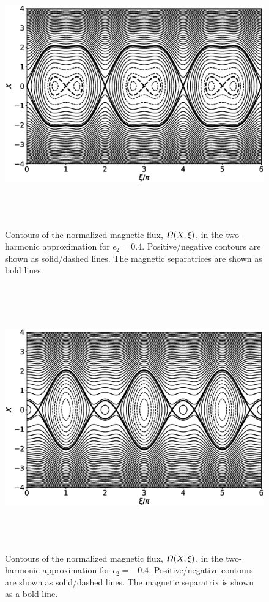 \documentclass[12pt,prb,aps]{revtex4-1}
\begin{document}
\begin{figure}
\centerline{\includegraphics[height=4.5in]{Figure3.eps}}
\caption{ Contours of the normalized magnetic flux, ${\mit\Omega}(X,\xi)$, in the two-harmonic approximation for 
$\epsilon_2=0.4$. Positive/negative contours are shown as solid/dashed lines. The magnetic separatrices are shown
as  bold lines.}\label{fig3}
\end{figure}

\begin{figure}
\centerline{\includegraphics[height=4.5in]{Figure4.eps}}
\caption{ Contours of the normalized magnetic flux, ${\mit\Omega}(X,\xi)$, in the two-harmonic approximation for 
$\epsilon_2=-0.4$. Positive/negative contours are shown as solid/dashed lines. The magnetic separatrix is shown
as a  bold line.}\label{fig4}
\end{figure}
\end{document}

